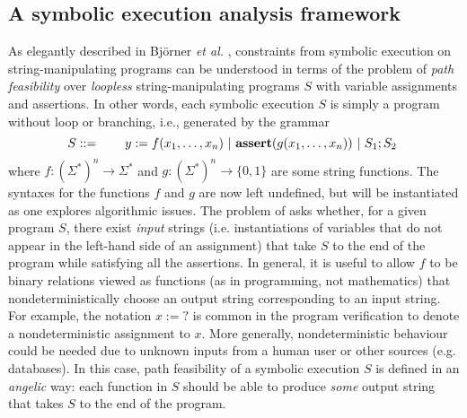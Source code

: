 \subsection{A symbolic execution analysis framework} \label{subsec:symexe} 
As elegantly described in Bj\"{o}rner \emph{et al.} \cite{BTV09}, constraints 
from symbolic 
execution on string-manipulating programs can be understood in terms of the
problem of \emph{path 
feasibility} over \emph{loopless} string-manipulating programs $S$ with variable
assignments and assertions. 
In other words, each symbolic execution $S$ is simply a program 
without loop or branching, i.e., generated by the grammar
\begin{equation*}
    S ::= \qquad y := f(x_1,\ldots,x_n) \ |\ \text{\ASSERT{$g(x_1,\ldots,x_n)$}}\ |\ 
            S_1; S_2\ 
\end{equation*}
where $f: (\Sigma^*)^n \to \Sigma^*$ and $g: (\Sigma^*)^n \to \{0,1\}$ are
some string functions. 
The syntaxes for the functions $f$ and $g$ are now
left undefined, but will be instantiated as one explores algorithmic issues.
The problem of \defn{path feasibility}
asks whether, for a given program $S$, there exist \emph{input} strings (i.e. 
instantiations of variables that do not appear in the left-hand side of an 
assignment) that take
$S$ to the end of the program while satisfying all the assertions. 
In general, it is useful to allow $f$ to be %
binary relations viewed as functions (as in programming, not mathematics) that 
nondeterministically choose an output string corresponding to an input string. 
For example, the 
notation $x := ?$ is common in the program verification to 
denote a nondeterministic assignment to $x$. More generally, nondeterministic
behaviour could be needed due to unknown inputs from a human user or other 
sources (e.g. databases). In this case, path feasibility of a
symbolic execution $S$
is defined in an \emph{angelic} way: each function in $S$
should be able to produce \emph{some} output string that takes $S$ to the end of the
program.

